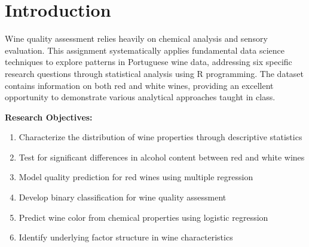 \chapter{Introduction}

Wine quality assessment relies heavily on chemical analysis and sensory evaluation. This assignment systematically applies fundamental data science techniques to explore patterns in Portuguese wine data, addressing six specific research questions through statistical analysis using R programming. The dataset contains information on both red and white wines, providing an excellent opportunity to demonstrate various analytical approaches taught in class.

\textbf{Research Objectives:}
\begin{enumerate}
\item Characterize the distribution of wine properties through descriptive statistics
\item Test for significant differences in alcohol content between red and white wines
\item Model quality prediction for red wines using multiple regression
\item Develop binary classification for wine quality assessment
\item Predict wine color from chemical properties using logistic regression
\item Identify underlying factor structure in wine characteristics
\end{enumerate}